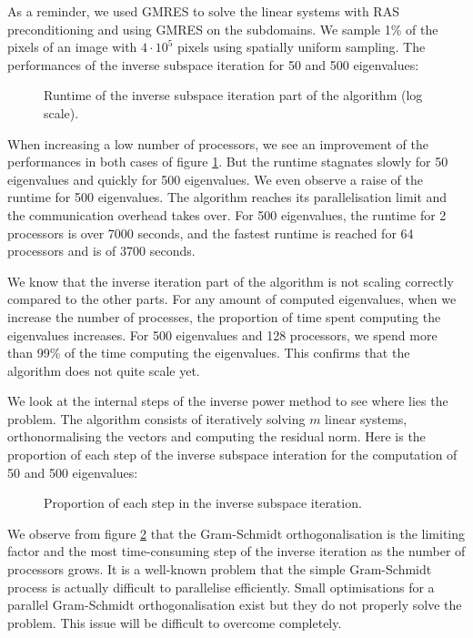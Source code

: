 As a reminder, we used GMRES to solve the linear systems with RAS preconditioning and using GMRES on the subdomains.
We sample 1\% of the pixels of an image with \(4 \cdot 10^5\) pixels using spatially uniform sampling.
The performances of the inverse subspace iteration for 50 and 500 eigenvalues:

\begin{figure}[H]
 \centering
 
 \caption{Runtime of the inverse subspace iteration part of the algorithm (log scale).}
 \label{fig:inv_it_runtime}
\end{figure}

When increasing a low number of processors, we see an improvement of the performances in both cases of figure \ref{fig:inv_it_runtime}.
But the runtime stagnates slowly for 50 eigenvalues and quickly for 500 eigenvalues.
We even observe a raise of the runtime for 500 eigenvalues.
The algorithm reaches its parallelisation limit and the communication overhead takes over.
For 500 eigenvalues, the runtime for 2 processors is over 7000 seconds, and the fastest runtime is reached for 64 processors and is of 3700 seconds.

\ifthesis
 We know that the inverse iteration part of the algorithm is not scaling correctly compared to the other parts.
 For any amount of computed eigenvalues, when we increase the number of processes, the proportion of time spent computing the eigenvalues increases.
 For 500 eigenvalues and 128 processors, we spend more than 99\% of the time computing the eigenvalues.
 This confirms that the algorithm does not quite scale yet.
\fi

We look at the internal steps of the inverse power method to see where lies the problem.
The algorithm consists of iteratively solving \(m\) linear systems, orthonormalising the vectors and computing the residual norm.
Here is the proportion of each step of the inverse subspace interation for the computation of 50 and 500 eigenvalues:

\begin{figure}[H]
 \centering
 
 \caption{Proportion of each step in the inverse subspace iteration.}
 \label{fig:inv_it_proportion}
\end{figure}

We observe from figure \ref{fig:inv_it_proportion} that the Gram-Schmidt orthogonalisation is the limiting factor and the most time-consuming step of the inverse iteration as the number of processors grows.
It is a well-known problem that the simple Gram-Schmidt process is actually difficult to parallelise efficiently.
Small optimisations for a parallel Gram-Schmidt orthogonalisation exist \cite{katagiri_parallel_gram_schmidt_2003} but they do not properly solve the problem.
This issue will be difficult to overcome completely.
